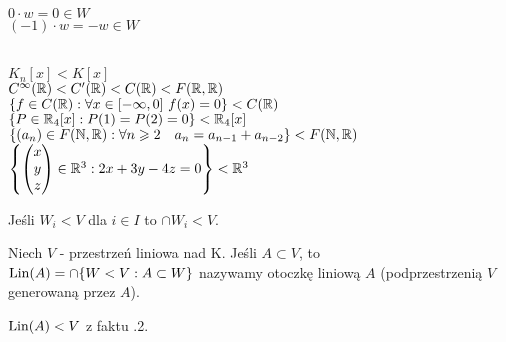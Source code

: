 \begin{dd}
    ~\\
    $ 0\cdot w = 0 \in W$ \\
    $(-1)\cdot w = -w \in W$
\end{dd}
\begin{przy}
    ~\\
    $K_n[x] < K[x]$ \\
    $C^\infty(\mathbb{R}) < C'(\mathbb{R}) < C(\mathbb{R}) < F(\mathbb{R},\mathbb{R})$ \\
    $\{f \in C(\RR) : \forall x \in [-\infty,0] \ f(x) = 0\} < C(\RR)$ \\
    $\{P \in \mathbb{R}_4[x] : P(1) = P(2) = 0\} < \mathbb{R}_4[x]$ \\
    $\{(a_n) \in F(\mathbb{N},\mathbb{R}) : \forall n \geqslant 2 \quad a_n = a_{n-1} + a_{n-2} \} < F(\mathbb{N},\mathbb{R})$ \\
    $\left\{
        \begin{pmatrix}
            x \\
            y \\
            z
        \end{pmatrix}
        \in \mathbb{R}^3 : 2x + 3y - 4z = 0
        \right\} < \mathbb{R}^3
    $
\end{przy}
\begin{ft}
    Jeśli $W_i < V $ dla $i \in I$ to $\cap W_i < V$.
\end{ft}

\begin{df}
    Niech $V$ - przestrzeń liniowa nad K. Jeśli $A \subset V$, to \\
    $\operatorname{\operatorname{Lin}}(A) = \cap \{W < V: A \subset W \}$ nazywamy otoczkę liniową $A$ 
    (podprzestrzenią $V$ generowaną przez $A$).
\end{df}
\begin{uw}
    $\operatorname{Lin}(A) < V $ z faktu \thesection.2.
\end{uw}

